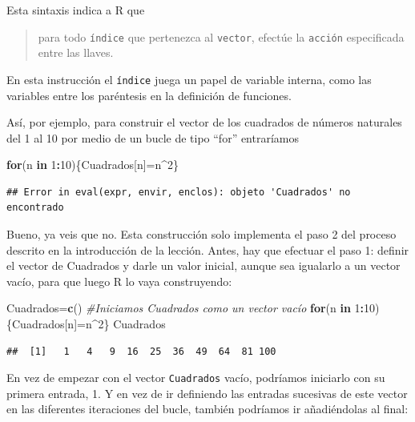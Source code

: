 \documentclass[]{book}
\newenvironment{Shaded}{\begin{snugshade}}{\end{snugshade}}
\newcommand{\CommentTok}[1]{\textcolor[rgb]{0.56,0.35,0.01}{\textit{#1}}}
\newcommand{\ControlFlowTok}[1]{\textcolor[rgb]{0.13,0.29,0.53}{\textbf{#1}}}
\newcommand{\DecValTok}[1]{\textcolor[rgb]{0.00,0.00,0.81}{#1}}
\newcommand{\KeywordTok}[1]{\textcolor[rgb]{0.13,0.29,0.53}{\textbf{#1}}}
\newcommand{\NormalTok}[1]{#1}
\newcommand{\OperatorTok}[1]{\textcolor[rgb]{0.81,0.36,0.00}{\textbf{#1}}}
\theoremstyle{definition}
\theoremstyle{definition}
\theoremstyle{definition}
\theoremstyle{remark}
\begin{document}
Esta sintaxis indica a R que

\begin{quote}
para todo \texttt{índice} que pertenezca al \texttt{vector}, efectúe la \texttt{acción} especificada entre las llaves.
\end{quote}

En esta instrucción el \texttt{índice} juega un papel de variable interna, como las variables entre los paréntesis en la definición de funciones.

Así, por ejemplo, para construir el vector de los cuadrados de números naturales del 1 al 10 por medio de un bucle de tipo ``for'' entraríamos

\begin{Shaded}
\begin{Highlighting}[]
\ControlFlowTok{for}\NormalTok{(n }\ControlFlowTok{in} \DecValTok{1}\OperatorTok{:}\DecValTok{10}\NormalTok{)\{Cuadrados[n]=n}\OperatorTok{^}\DecValTok{2}\NormalTok{\}}
\end{Highlighting}
\end{Shaded}

\begin{verbatim}
## Error in eval(expr, envir, enclos): objeto 'Cuadrados' no encontrado
\end{verbatim}

Bueno, ya veis que no. Esta construcción solo implementa el paso 2 del proceso descrito en la introducción de la lección. Antes, hay que efectuar el paso 1: definir el vector de Cuadrados y darle un valor inicial, aunque sea igualarlo a un vector vacío, para que luego R lo vaya construyendo:

\begin{Shaded}
\begin{Highlighting}[]
\NormalTok{Cuadrados=}\KeywordTok{c}\NormalTok{()  }\CommentTok{#Iniciamos Cuadrados como un vector vacío}
\ControlFlowTok{for}\NormalTok{(n }\ControlFlowTok{in} \DecValTok{1}\OperatorTok{:}\DecValTok{10}\NormalTok{)\{Cuadrados[n]=n}\OperatorTok{^}\DecValTok{2}\NormalTok{\}}
\NormalTok{Cuadrados}
\end{Highlighting}
\end{Shaded}

\begin{verbatim}
##  [1]   1   4   9  16  25  36  49  64  81 100
\end{verbatim}

En vez de empezar con el vector \texttt{Cuadrados} vacío, podríamos iniciarlo con su primera entrada, 1. Y en vez de ir definiendo las entradas sucesivas de este vector en las diferentes iteraciones del bucle, también podríamos ir añadiéndolas al final:
\end{document}
